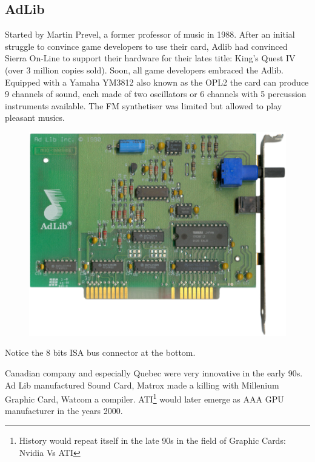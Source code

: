 \documentclass[book.tex]{subfiles}
\begin{document}
  \subsection{AdLib}
  Started by Martin Prevel, a former professor of music in 1988. After an initial struggle to convince game developers to use their card, Adlib had convinced Sierra On-Line to support their hardware for their lates title: King's Quest IV (over 3 million copies sold). Soon, all game developers embraced the Adlib. Equipped with a Yamaha YM3812 also known as the OPL2 the card can produce 9 channels of sound, each made of two oscillators or 6 channels with 5 percussion instruments available. The FM synthetiser was limited but allowed to play pleasant musics.\\
  \begin{figure}[H] \centering \includegraphics[width=\textwidth]{imgs/hardware/adlib.png} \end{figure}
    Notice the 8 bits ISA bus connector at the bottom.
\par
{} Canadian company and especially Quebec were very innovative in the early 90s. Ad Lib manufactured Sound Card, Matrox made a killing with Millenium Graphic Card, Watcom a compiler. ATI\footnote{History would repeat itself in the late 90s in the field of Graphic Cards: Nvidia Vs ATI} would later emerge as AAA GPU manufacturer in the years 2000.\\
  
  
\end{document}

